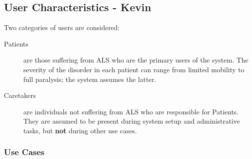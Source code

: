 \documentclass{article}
\begin{document}
\subsection{User Characteristics - Kevin}

Two categories of users are considered:

\begin{description}
    \item[Patients] are those suffering from ALS who are the primary users of
        the system. The severity of the disorder in each patient can range
        from limited mobility to full paralysis; the system assumes the
        latter.
    \item[Caretakers] are individuals not suffering from ALS who are
        responsible for Patients. They are assumed to be present during system
        setup and administrative tasks, but \textbf{not} during other use
        cases.
\end{description}

\subsubsection{Use Cases}

\end{document}
